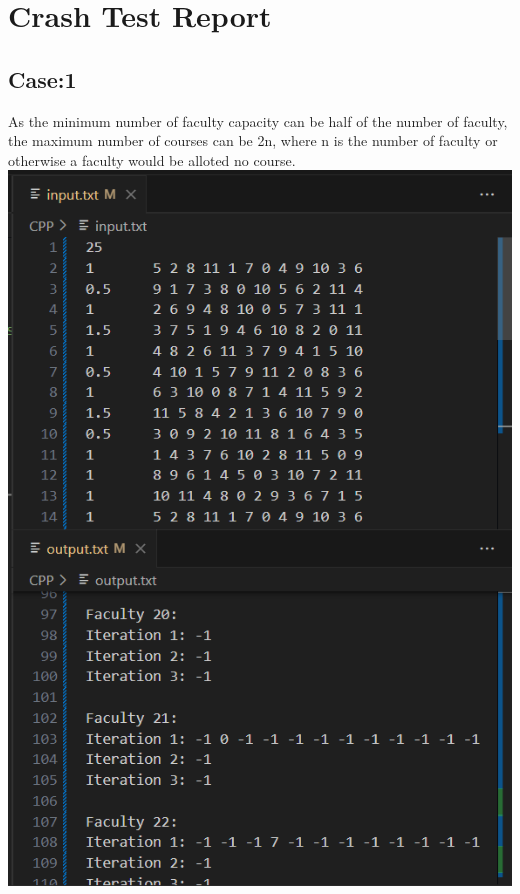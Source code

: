 \documentclass{article}
\begin{document}
\section{Crash Test Report}
\subsection{Case:1}
As the minimum number of faculty capacity can be half of the number of faculty, the maximum number of courses can be 2n, where n is the number of faculty or otherwise a faculty would be alloted no course. \\
\includegraphics[scale=0.5]{images/crash1.png}\\
\end{document}
